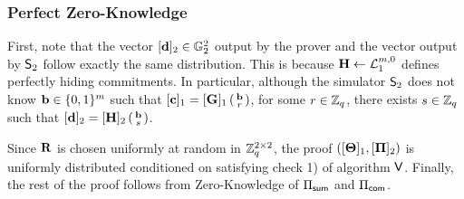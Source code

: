 \subsubsection{Perfect Zero-Knowledge}
First, note that the vector $[\mathbf{d}]_2 \in \mathbb{G}_2^2$ output by the prover and the vector output by $\mathsf{S}_2$ follow exactly the same distribution. This is because $\mathbf{{H}}\gets\mathcal{L}_1^{m,0}$ defines perfectly hiding commitments. In particular, although the simulator $\mathsf{S}_2$ does not know $\mathbf{b} \in \{0,1\}^{m}$ such that $[\mathbf{c}]_1=[\mathbf{{G}}]_1\left(\begin{smallmatrix}\mathbf{b}\\r\end{smallmatrix}\right)$, for some $r\in\mathbb{Z}_q$, 
there exists $s \in \mathbb{Z}_q$ such that $[\mathbf{d}]_2=[\mathbf{{H}}]_2\left(\begin{smallmatrix}\mathbf{b}\\ s\end{smallmatrix}\right)$. 

Since $\mathbf{{R}}$ is chosen uniformly at random in $\mathbb{Z}_q^{2 \times 2}$, the proof $([\mathbf{{\Theta}}]_1, [\mathbf{{\Pi}}]_2)$ is uniformly distributed conditioned on satisfying check 1) of algorithm $\mathsf{V}$.
 Finally, the rest of the proof follows from Zero-Knowledge of $\Pi_{\mathsf{sum}}$ and $\Pi_{\mathsf{com}}$.
